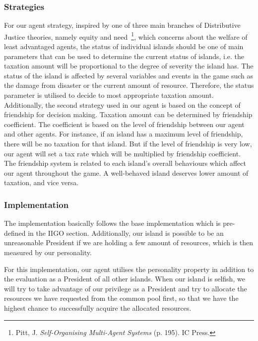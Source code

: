 \subsubsection{Strategies} \label{subsubsec:Team6_President:Strategies}
For our agent strategy, inspired by one of three main branches of Distributive Justice theories, namely equity and need~\footnote{Pitt, J. \textit{Self-Organising Multi-Agent Systems} (p. 195). IC Press.}, which concerns about the welfare of least advantaged agents, the status of individual islands should be one of main parameters that can be used to determine the current status of islands, i.e. the taxation amount will be proportional to the degree of severity the island has. The status of the island is affected by several variables and events in the game such as the damage from disaster or the current amount of resource. Therefore, the status parameter is utilised to decide to most appropriate taxation amount. Additionally, the second strategy used in our agent is based on the concept of friendship for decision making. Taxation amount can be determined by friendship coefficient. The coefficient is based on the level of friendship between our agent and other agents. For instance, if an island has a maximum level of friendship, there will be no taxation for that island. But if the level of friendship is very low, our agent will set a tax rate which will be multiplied by friendship coefficient. The friendship system is related to each island’s overall behaviours which affect our agent throughout the game. A well-behaved island deserves lower amount of taxation, and vice versa. 

\subsubsection{Implementation} \label{subsubsec:Team6_President:Implementation}
The implementation basically follows the base implementation which is pre-defined in the IIGO section. Additionally, our island is possible to be an unreasonable President if we are holding a few amount of resources, which is then measured by our personality.

For this implementation, our agent utilises the personality property in addition to the evaluation as a President of all other islands. When our island is selfish, we will try to take advantage of our privilege as a President and try to allocate the resources we have requested from the common pool first, so that we have the highest chance to successfully acquire the allocated resources.

